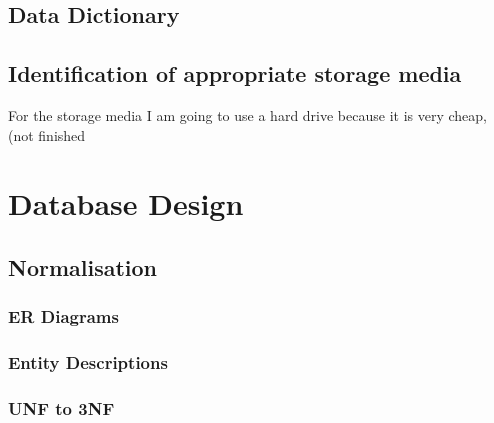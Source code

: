 \subsection{Data Dictionary}

\subsection{Identification of appropriate storage media}

For the storage media I am going to use a hard drive because it is very cheap, (not finished

\section{Database Design}

\subsection{Normalisation}

\subsubsection{ER Diagrams}

\subsubsection{Entity Descriptions}

\subsubsection{UNF to 3NF}

